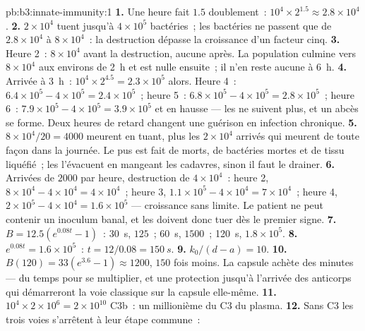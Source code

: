 \begin{solution}{pb:b3:innate-immunity:1}
\textbf{1.} Une heure fait $1.5$ doublement~: $10^{4}\times 2^{1.5} \approx
2.8\times 10^{4}$.
\textbf{2.} $2\times 10^{4}$  tuent jusqu'à $4\times 10^{5}$
bactéries~; les bactéries ne passent que de $2.8\times 10^{4}$ à
$8\times 10^{4}$~: la destruction dépasse la croissance d'un facteur cinq.
\textbf{3.} Heure 2~: $8\times 10^{4}$ avant la destruction, aucune
après. La population culmine vers $8\times 10^{4}$ aux environs de
\qty{2}{h} et est nulle ensuite~; il n'en reste aucune à \qty{6}{h}.
\textbf{4.} Arrivée à \qty{3}{h}~: $10^{4}\times 2^{4.5} = 2.3\times
10^{5}$ alors. Heure 4~: $6.4\times 10^{5} - 4\times 10^{5} = 2.4\times
10^{5}$~; heure 5~: $6.8\times 10^{5} - 4\times 10^{5} = 2.8\times 10^{5}$~;
heure 6~: $7.9\times 10^{5} - 4\times 10^{5} = 3.9\times 10^{5}$ et en
hausse --- les  ne suivent plus, et un abcès se forme. Deux
heures de retard changent une guérison en infection chronique.
\textbf{5.} $8\times 10^{4}/20 = 4000$  meurent en tuant,
plus les $2\times 10^{4}$ arrivés qui meurent de toute façon dans la
journée. Le pus est fait de  morts, de bactéries mortes et de
tissu liquéfié~; les  l'évacuent en mangeant les cadavres,
sinon il faut le drainer.
\textbf{6.} Arrivées de $2000$ par heure, destruction de
$4\times 10^{4}$~: heure 2,
$8\times 10^{4} - 4\times 10^{4} = 4\times 10^{4}$~; heure 3, $1.1\times
10^{5} - 4\times 10^{4} = 7\times 10^{4}$~; heure 4, $2\times 10^{5} -
4\times 10^{4} = 1.6\times 10^{5}$ --- croissance sans limite. Le patient
ne peut contenir un inoculum banal, et les  doivent donc
tuer dès le premier signe.
\textbf{7.} $B = 12.5(e^{0.08t} - 1)$~: \qty{30}{s}, $125$~; \qty{60}{s},
$1500$~; \qty{120}{s}, $1.8\times 10^{5}$.
\textbf{8.} $e^{0.08t} = 1.6\times 10^{5}$~: $t = 12/0.08 = \qty{150}{s}$.
\textbf{9.} $k_{0}/(d - a) = 10$.
\textbf{10.} $B(120) = 33(e^{3.6} - 1) \approx 1200$, $150$ fois moins.
La capsule achète des minutes --- du temps pour se multiplier, et une
protection jusqu'à l'arrivée des anticorps qui démarreront la voie
classique sur la capsule elle-même.
\textbf{11.} $10^{4}\times 2\times 10^{6} = 2\times 10^{10}$ C3b~: un
millionième du C3 du plasma.
\textbf{12.} Sans C3 les trois voies s'arrêtent à leur étape commune~:

\end{solution}
